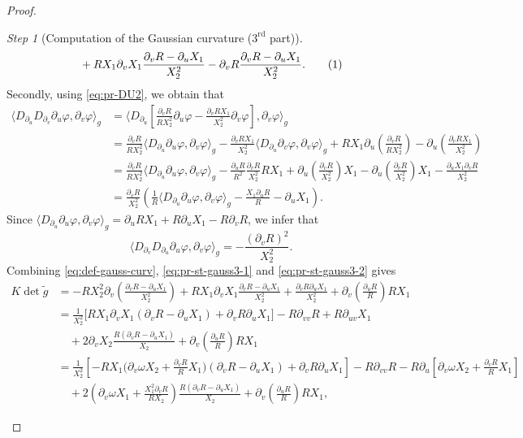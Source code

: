 \documentclass{article}
\newcommand{\DUV}{\partial_{uv}}
\newcommand{\DVV}{\partial_{vv}}
\newcommand{\DU}{\partial_{u}}
\newcommand{\DV}{\partial_{v}}
\theoremstyle{remark}
\theoremstyle{prpart}
\newtheorem{proofpart}{Step}
\newcommand{\snum}{\addtocounter{equation}{1}\tag{\theequation}}
\newcommand{\PU}{\partial_{u}\varphi}
\newcommand{\PV}{\partial_{v}\varphi}
\begin{document}
\begin{proof}
\begin{proofpart}[Computation of the Gaussian curvature ($3^{\text{rd}}$ part)]
\begin{align*}
  &\quad+ RX_1\DV X_{1}\frac{\DV R-\DU X_{1}}{X_2^2}- \DV R\frac{\DV R-\DU X_{1}}{X_2^2}.\snum\label{eq:pr-st-gauss3-1}
\end{align*}
\normalsize
Secondly, using \eqref{eq:pr-DU2}, we obtain that
\small
\begin{align*}
\big\langle D_{\partial_u}D_{\partial_v}\PU,\PV\big\rangle_g &= \big\langle D_{\partial_u}\left[\frac{\DV R}{RX_2^2}\PU - \frac{\DV RX_1}{X_2^2}\PV\right],\PV\big\rangle_g\\
&= \frac{\DV R}{RX_2^2}\big\langle D_{\partial_u}\PU,\PV\big\rangle_g - \frac{\DV RX_1}{X_2^2}\big\langle D_{\partial_u}\PV,\PV\big\rangle_g
+ RX_1\DU\left(\frac{\DV R}{RX_2^2}\right) - \DU\left(\frac{\DV RX_1}{X_2^2}\right)\\
&= \frac{\DV R}{RX_2^2}\big\langle D_{\partial_u}\PU,\PV\big\rangle_g  -\frac{\DU R}{R^2}\frac{\DV R}{X_2^2}RX_1 + \DU\left(\frac{\DV R}{X_2^2}\right)X_1- \DU\left(\frac{\DV R}{X_2^2}\right)X_1 - \frac{\DU X_{1}\DV R}{X_2^2}\\
&=\frac{\DV R}{X_2^2} \left(\frac{1}{R}\big\langle D_{\partial_u}\PU,\PV\big\rangle_g - \frac{X_1\DU R}{R}-\DU X_{1}\right).
\end{align*}
\normalsize
Since $\langle D_{\partial_u}\PU,\PV\rangle_g = \DU RX_1+R\DU X_{1}-R\DV R$, we infer that
\begin{equation}\label{eq:pr-st-gauss3-2}
  \big\langle D_{\partial_v}D_{\partial_u}\PU,\PV\big\rangle_g=-\frac{(\DV R)^2}{X_2^2}.
\end{equation}
Combining \eqref{eq:def-gauss-curv}, \eqref{eq:pr-st-gauss3-1} and \eqref{eq:pr-st-gauss3-2} gives
\small
\begin{align*}
K\det \tilde g &= -RX_2^2\DV\left(\frac{\DV R-\DU X_{1}}{X_2^2}\right) + RX_1\DV X_{1}\frac{\DV R-\DU X_{1}}{X_2^2} 
+ \frac{\DV R\DU X_{1}}{X_2^2}+\DV\left(\frac{\DU R}{R}\right)RX_1\\
               &= \frac{1}{X_2^2}\big[RX_1\DV X_{1}(\DV R-\DU X_{1}) + \DV R\DU X_{1}\big] -R\DVV R+R \DUV X_{1} \\
  &\quad+ 2\DV X_{2}\frac{R(\DV R-\DU X_{1})}{X_2} + \DV\left(\frac{\DU R}{R}\right)RX_1\\
               &=  \frac{1}{X_2^2}\left[-RX_1\Big(\DV\omega X_2+\frac{\DV R}{R}X_1\Big) (\DV R-\DU X_{1})+\DV R\DU X_{1}\right]-R\DVV R-R\DU\left[\DV \omega X_2+\frac{\DV R}{R}X_1\right]\\
&\quad +2\left(\DV\omega X_1+\frac{X_1^2\DV R}{RX_2}\right)\frac{R(\DV R-\DU X_{1})}{X_2}+\DV\left(\frac{\DU R}{R}\right)RX_1,
\end{align*}

\end{proofpart}
\end{proof}
\end{document}
